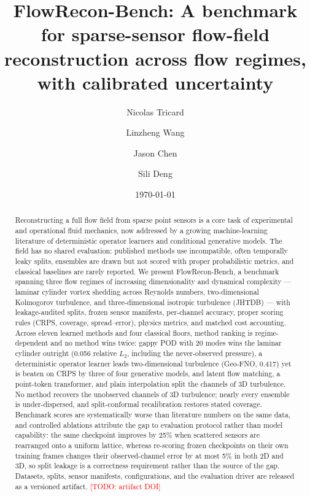 \documentclass[aip,pof,reprint,amsmath,amssymb,superscriptaddress]{revtex4-1}
\newcommand{\todo}[1]{\textcolor{red}{[TODO: #1]}}
\newcommand{\benchname}{FlowRecon-Bench}
\begin{document}
\title{\benchname{}: A benchmark for sparse-sensor flow-field reconstruction
across flow regimes, with calibrated uncertainty}

\author{Nicolas Tricard}
\author{Linzheng Wang}
\author{Jason Chen}
\author{Sili Deng}

\date{\today}

\begin{abstract}
Reconstructing a full flow field from sparse point sensors is a core task of
experimental and operational fluid mechanics, now addressed by a growing
machine-learning literature of deterministic operator learners and conditional
generative models. The field has no shared evaluation: published methods use
incompatible, often temporally leaky splits, ensembles are drawn but not scored
with proper probabilistic metrics, and classical baselines are rarely reported.
We present \benchname{}, a benchmark spanning three flow regimes of increasing
dimensionality and dynamical complexity --- laminar cylinder vortex shedding
across Reynolds numbers, two-dimensional Kolmogorov turbulence, and
three-dimensional isotropic turbulence (JHTDB) --- with leakage-audited splits,
frozen sensor manifests, per-channel accuracy, proper scoring rules (CRPS,
coverage, spread--error), physics metrics, and matched cost accounting. Across
eleven learned methods and four classical floors, method ranking is
regime-dependent and no method wins twice: gappy POD with 20 modes wins the
laminar cylinder outright (0.056 relative $L_2$, including the never-observed
pressure), a deterministic operator learner leads two-dimensional turbulence
(Geo-FNO, 0.417) yet is beaten on CRPS by three of four generative models, and
latent flow matching, a point-token transformer, and plain interpolation split
the channels of 3D turbulence. No method recovers the unobserved channels of 3D
turbulence; nearly every ensemble is under-dispersed, and split-conformal
recalibration restores stated coverage. Benchmark scores are systematically
worse than literature numbers on the same data, and controlled ablations
attribute the gap to evaluation protocol rather than model capability: the same
checkpoint improves by 25\% when scattered sensors are rearranged onto a uniform
lattice, whereas re-scoring frozen checkpoints on their own training frames
changes their observed-channel error by at most 5\% in both 2D and 3D, so split
leakage is a correctness requirement rather than the source of the gap. Datasets,
splits, sensor manifests, configurations, and the evaluation driver are released
as a versioned artifact. \todo{artifact DOI}
\end{abstract}
\end{document}
